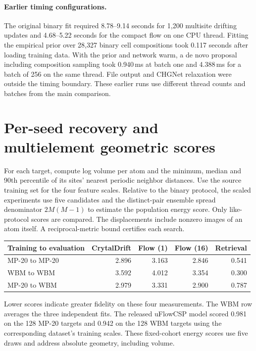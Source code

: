 \documentclass[10pt]{article}
\begin{document}
\paragraph{Earlier timing configurations.}
The original binary fit required 8.78--9.14 seconds for 1,200 multisite drifting updates and 4.68--5.22 seconds for the compact flow on one CPU thread. Fitting the empirical prior over 28,327 binary cell compositions took 0.117 seconds after loading training data. With the prior and network warm, a de novo proposal including composition sampling took 0.940\,ms at batch one and 4.388\,ms for a batch of 256 on the same thread. File output and CHGNet relaxation were outside the timing boundary. These earlier runs use different thread counts and batches from the main comparison.

\section{Per-seed recovery and multielement geometric scores}



For each target, compute log volume per atom and the minimum, median and 90th percentile of its sites' nearest periodic neighbor distances. Use the source training set for the four feature scales. Relative to the binary protocol, the scaled experiments use five candidates and the distinct-pair ensemble spread denominator $2M(M-1)$ to estimate the population energy score. Only like-protocol scores are compared. The displacements include nonzero images of an atom itself. A reciprocal-metric bound certifies each search.
\begin{center}\small
\begin{tabular}{lrrrr}\hline
Training to evaluation & CrytalDrift & Flow (1) & Flow (16) & Retrieval\\\hline
MP-20 to MP-20 & 2.896 & 3.163 & 2.846 & 0.541\\
WBM to WBM & 3.592 & 4.012 & 3.354 & 0.300\\
MP-20 to WBM & 2.979 & 3.331 & 2.900 & 0.787\\\hline
\end{tabular}
\end{center}
Lower scores indicate greater fidelity on these four measurements. The WBM row averages the three independent fits. The released uFlowCSP model scored 0.981 on the 128 MP-20 targets and 0.942 on the 128 WBM targets using the corresponding dataset's training scales. These fixed-cohort energy scores use five draws and address absolute geometry, including volume.
\end{document}
